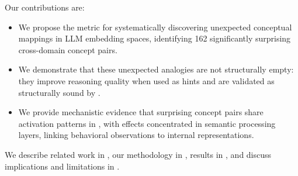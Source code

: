 Our contributions are:
\begin{itemize}[leftmargin=*,itemsep=0pt,topsep=0pt]
    \item We propose the \surprisescore metric for systematically discovering unexpected conceptual mappings in LLM embedding spaces, identifying 162 significantly surprising cross-domain concept pairs.
    \item We demonstrate that these unexpected analogies are not structurally empty: they improve reasoning quality when used as hints and are validated as structurally sound by \gptfour.
    \item We provide mechanistic evidence that surprising concept pairs share activation patterns in \pythia, with effects concentrated in semantic processing layers, linking behavioral observations to internal representations.
\end{itemize}

We describe related work in , our methodology in , results in , and discuss implications and limitations in .
